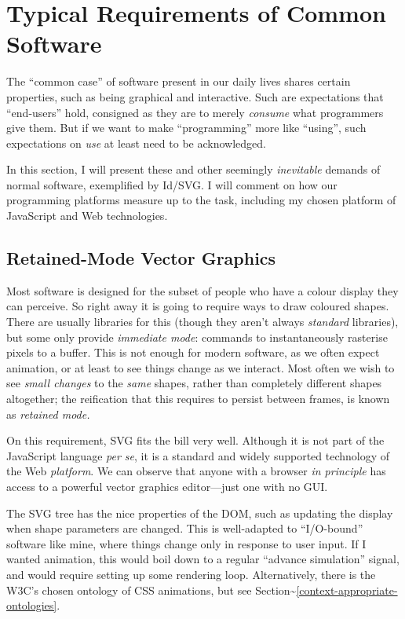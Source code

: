 \hypertarget{typical-requirements-of-common-software}{%
\section{Typical Requirements of Common
Software}\label{typical-requirements-of-common-software}}

The ``common case'' of software present in our daily lives shares
certain properties, such as being graphical and interactive. Such are
expectations that ``end-users'' hold, consigned as they are to merely
\emph{consume} what programmers give them. But if we want to make
``programming'' more like ``using'', such expectations on \emph{use} at
least need to be acknowledged.

In this section, I will present these and other seemingly
\emph{inevitable} demands of normal software, exemplified by Id{}/SVG. I
will comment on how our programming platforms measure up to the task,
including my chosen platform of JavaScript and Web technologies.

\hypertarget{retained-mode-vector-graphics}{%
\subsection{Retained-Mode Vector
Graphics}\label{retained-mode-vector-graphics}}

Most software is designed for the subset of people who have a colour
display they can perceive. So right away it is going to require ways to
draw coloured shapes. There are usually libraries for this (though they
aren't always \emph{standard} libraries), but some only provide
\emph{immediate mode}: commands to instantaneously rasterise pixels to a
buffer. This is not enough for modern software, as we often expect
animation, or at least to see things change as we interact. Most often
we wish to see \emph{small changes} to the \emph{same} shapes, rather
than completely different shapes altogether; the reification that this
requires to persist between frames, is known as \emph{retained mode.}

On this requirement, SVG fits the bill very well. Although it is not
part of the JavaScript language \emph{per se}, it is a standard and
widely supported technology of the Web \emph{platform}. We can observe
that anyone with a browser \emph{in principle} has access to a powerful
vector graphics editor---just one with no GUI.

The SVG tree has the nice properties of the DOM, such as updating the
display when shape parameters are changed. This is well-adapted to
``I/O-bound'' software like mine, where things change only in response
to user input. If I wanted animation, this would boil down to a regular
``advance simulation'' signal, and would require setting up some
rendering loop. Alternatively, there is the W3C's chosen ontology of CSS
animations, but see
Section\textasciitilde{}\ref{context-appropriate-ontologies}.


